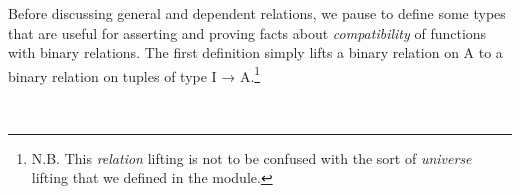 Before discussing general and dependent relations, we pause to define some types that are useful for asserting and proving facts about \emph{compatibility} of functions with binary relations. The first definition simply lifts a binary relation on \ab A to a binary relation on tuples of type \ab I \as → \ab A.\footnote{N.B. This \emph{relation} lifting is not to be confused with the sort of \emph{universe} lifting that we defined in the  module.}
\ccpad
\begin{code}%
\>[1]\AgdaSpace{}%
\AgdaSymbol{:}\AgdaSpace{}%
\AgdaSpace{}%
\AgdaSpace{}%
\AgdaSpace{}%
\AgdaSpace{}%
\AgdaSymbol{(}\AgdaSpace{}%
\AgdaSpace{}%
\AgdaSymbol{)}\AgdaSpace{}%
\AgdaSpace{}%
\AgdaSymbol{(}\AgdaSpace{}%
\AgdaSpace{}%
\AgdaSymbol{)}\AgdaSpace{}%
\AgdaSpace{}%
\AgdaSpace{}%
\AgdaSpace{}%
\AgdaSpace{}%
\<%
\\
%
\>[1]\AgdaSpace{}%
\AgdaSpace{}%
\AgdaSpace{}%
\AgdaSpace{}%
\AgdaSymbol{=}\AgdaSpace{}%
\AgdaSpace{}%
\AgdaSpace{}%
\AgdaSpace{}%
\AgdaSpace{}%
\AgdaSymbol{(}\AgdaSpace{}%
\AgdaSymbol{)}\AgdaSpace{}%
\AgdaSymbol{(}\AgdaSpace{}%
\AgdaSymbol{)}\<%
\end{code}
\scpad
